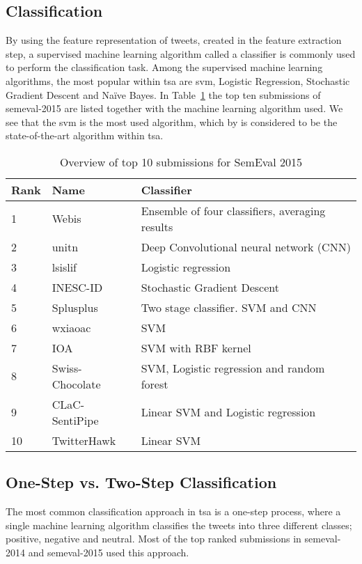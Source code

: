 \subsection{Classification}
By using the feature representation of tweets, created in the feature extraction step, a supervised machine learning algorithm called a classifier is commonly used to perform the classification task. Among the supervised machine learning algorithms, the most popular within \ac{tsa} are \ac{svm}, Logistic Regression, Stochastic Gradient Descent and Naïve Bayes. In Table~\ref{tab:semeval_2015_results} the top ten submissions of \ac{semeval}-2015 are listed together with the machine learning algorithm used. We see that the \ac{svm} is the most used algorithm, which by \cite{Svetlana14} is considered to be the state-of-the-art algorithm within \ac{tsa}. \\     

\noindent\begin{table}[ht]
    \begin{tabular}{| l | l | l |}
        \hline
        \textbf{Rank} & \textbf{Name} & \textbf{Classifier} \\ \hline
        1 & Webis & Ensemble of four classifiers, averaging results \\ \hline
        2 & unitn & Deep Convolutional neural network (CNN) \\ \hline
        3 & lsislif & Logistic regression \\ \hline
        4 & INESC-ID & Stochastic Gradient Descent \\ \hline
        5 & Splusplus & Two stage classifier. SVM and CNN \\ \hline
        6 & wxiaoac & SVM \\ \hline
        7 & IOA & SVM with RBF kernel \\ \hline
        8 & Swiss-Chocolate & SVM, Logistic regression and random forest \\ \hline
        9 & CLaC-SentiPipe & Linear SVM and Logistic regression \\ \hline
        10 & TwitterHawk & Linear SVM \\ \hline
    \end{tabular}
    \caption{Overview of top 10 submissions for SemEval 2015}
    \label{tab:semeval_2015_results}
\end{table}

\subsection*{One-Step vs. Two-Step Classification}
The most common classification approach in \ac{tsa} is a one-step process, where a single machine learning algorithm classifies the tweets into three different classes; positive, negative and neutral. Most of the top ranked submissions in \ac{semeval}-2014 and \ac{semeval}-2015 used this approach. \\

